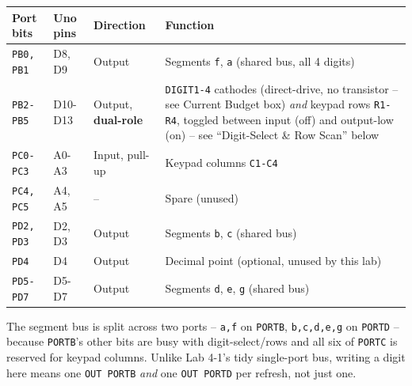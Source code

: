 \documentclass[11pt]{article}
\begin{document}
\begin{summary}
\begin{center}
\begin{tabular}{@{}p{2.0cm}p{1.7cm}p{2.6cm}p{7.6cm}@{}}
\toprule
\textbf{Port bits} & \textbf{Uno pins} & \textbf{Direction} & \textbf{Function} \\
\midrule
\texttt{PB0, PB1} & D8, D9 & Output & Segments \texttt{f}, \texttt{a} (shared bus,
all 4 digits) \\
\texttt{PB2-PB5} & D10-D13 & Output, \textbf{dual-role} & \texttt{DIGIT1-4}
cathodes (direct-drive, no transistor -- see Current Budget box) \emph{and}
keypad rows \texttt{R1-R4}, toggled between input (off) and output-low (on) --
see ``Digit-Select \& Row Scan'' below \\
\texttt{PC0-PC3} & A0-A3 & Input, pull-up & Keypad columns \texttt{C1-C4} \\
\texttt{PC4, PC5} & A4, A5 & -- & Spare (unused) \\
\texttt{PD2, PD3} & D2, D3 & Output & Segments \texttt{b}, \texttt{c} (shared bus) \\
\texttt{PD4} & D4 & Output & Decimal point (optional, unused by this lab) \\
\texttt{PD5-PD7} & D5-D7 & Output & Segments \texttt{d}, \texttt{e}, \texttt{g}
(shared bus) \\
\bottomrule
\end{tabular}
\end{center}
The segment bus is split across two ports -- \texttt{a,f} on \texttt{PORTB},
\texttt{b,c,d,e,g} on \texttt{PORTD} -- because \texttt{PORTB}'s other bits are
busy with digit-select/rows and all six of \texttt{PORTC} is reserved for
keypad columns. Unlike Lab 4-1's tidy single-port bus, writing a digit here means
one \texttt{OUT PORTB} \emph{and} one \texttt{OUT PORTD} per refresh, not just one.
\end{summary}
\end{document}
